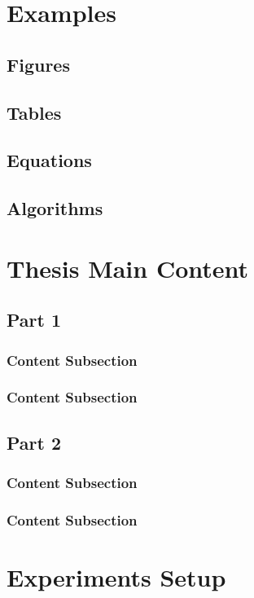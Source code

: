 \documentclass[oneside,14pt]{extarticle}
\begin{document}
	\section{Examples} 
		\subsection{Figures} 
		\subsection{Tables} 
		\subsection{Equations} 
		\subsection{Algorithms} 
	\section{Thesis Main Content} 
		\subsection{Part 1}
			\subsubsection{Content Subsection}
			\subsubsection{Content Subsection}
		\subsection{Part 2}
			\subsubsection{Content Subsection}
			\subsubsection{Content Subsection}
	\section{Experiments Setup} 
\end{document}
